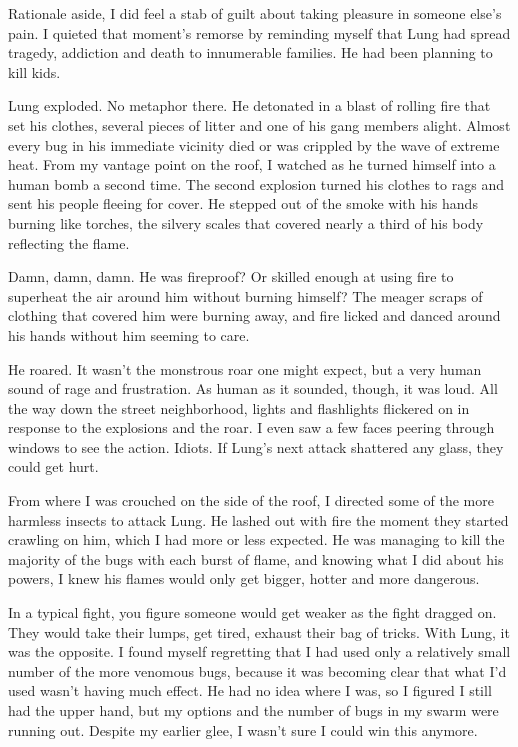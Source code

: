 Rationale aside, I did feel a stab of guilt about taking pleasure in someone else's pain. I quieted that moment's remorse by reminding myself that Lung had spread tragedy, addiction and death to innumerable families. He had been planning to kill kids.

Lung exploded. No metaphor there. He detonated in a blast of rolling fire that set his clothes, several pieces of litter and one of his gang members alight. Almost every bug in his immediate vicinity died or was crippled by the wave of extreme heat. From my vantage point on the roof, I watched as he turned himself into a human bomb a second time. The second explosion turned his clothes to rags and sent his people fleeing for cover. He stepped out of the smoke with his hands burning like torches, the silvery scales that covered nearly a third of his body reflecting the flame.

Damn, damn, damn. He was fireproof? Or skilled enough at using fire to superheat the air around him without burning himself? The meager scraps of clothing that covered him were burning away, and fire licked and danced around his hands without him seeming to care.

He roared. It wasn't the monstrous roar one might expect, but a very human sound of rage and frustration. As human as it sounded, though, it was loud. All the way down the street neighborhood, lights and flashlights flickered on in response to the explosions and the roar. I even saw a few faces peering through windows to see the action. Idiots. If Lung's next attack shattered any glass, they could get hurt.

From where I was crouched on the side of the roof, I directed some of the more harmless insects to attack Lung. He lashed out with fire the moment they started crawling on him, which I had more or less expected. He was managing to kill the majority of the bugs with each burst of flame, and knowing what I did about his powers, I knew his flames would only get bigger, hotter and more dangerous.

In a typical fight, you figure someone would get weaker as the fight dragged on. They would take their lumps, get tired, exhaust their bag of tricks. With Lung, it was the opposite. I found myself regretting that I had used only a relatively small number of the more venomous bugs, because it was becoming clear that what I'd used wasn't having much effect. He had no idea where I was, so I figured I still had the upper hand, but my options and the number of bugs in my swarm were running out. Despite my earlier glee, I wasn't sure I could win this anymore.


